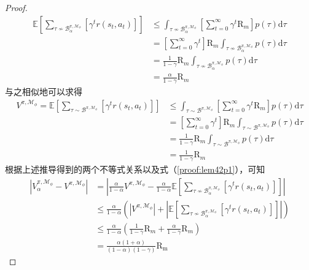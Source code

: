 \begin{proof}
\begin{align}
\mathbb{E}\left[{\sum}_{\tau \not\sim\mathcal{B}_\alpha^{\pi,\mathcal{M}_\phi}}\left[\gamma^t r(s_t,a_t)\right]\right] &\leq\int_{\tau\not\sim{\mathcal{B}_\alpha^{\pi,\mathcal{M}_\phi}}}\left[\sum_{t=0}^\infty\gamma^t \mathrm{R}_m\right]p(\tau)\mathrm{d}\tau\\
&=\left[\sum_{t=0}^\infty\gamma^t\right]\mathrm{R}_m\int_{\tau\not\sim{\mathcal{B}_\alpha^{\pi,\mathcal{M}_\phi}}}p(\tau)\mathrm{d}\tau\\
&= \frac{1}{1-\gamma}\mathrm{R}_m \int_{\tau\not\sim{\mathcal{B}_\alpha^{\pi,\mathcal{M}_\phi}}}p(\tau)\mathrm{d}\tau\\
&=\frac{\alpha}{1-\gamma}\mathrm{R}_m
\end{align}
与之相似地可以求得
\begin{align}
V^{\pi,\mathcal{M}_\phi} = \mathbb{E}\left[{\sum}_{\tau \sim\mathcal{B}^{\pi,\mathcal{M}_\phi}}\left[\gamma^t r(s_t,a_t)\right]\right] &\leq\int_{\tau \sim\mathcal{B}^{\pi,\mathcal{M}_\phi}}\left[\sum_{t=0}^\infty\gamma^t \mathrm{R}_m\right]p(\tau)\mathrm{d}\tau\\
&=\left[\sum_{t=0}^\infty\gamma^t\right]\mathrm{R}_m\int_{\tau \sim\mathcal{B}^{\pi,\mathcal{M}_\phi}}p(\tau)\mathrm{d}\tau\\
&= \frac{1}{1-\gamma}\mathrm{R}_m \int_{\tau \sim\mathcal{B}^{\pi,\mathcal{M}_\phi}}p(\tau)\mathrm{d}\tau\\
&=\frac{1}{1-\gamma}\mathrm{R}_m
\end{align}
根据上述推导得到的两个不等式关系以及式（\ref{proof:lem42p1}），可知
\begin{align}
|{V}_\alpha^{\pi, \mathcal{M}_{\phi}} - {V}^{\pi,\mathcal{M}_{\phi}}| &=  \left|\frac{\alpha}{1-\alpha}V^{\pi,\mathcal{M}_\phi}-\frac{\alpha}{1-\alpha}\mathbb{E}\left[{\sum}_{\tau \not\sim\mathcal{B}_\alpha^{\pi,\mathcal{M}_\phi}}\left[\gamma^t r(s_t,a_t)\right]\right]\right| \\
&\leq\frac{\alpha}{1-\alpha}\left(\left|V^{\pi,\mathcal{M}_\phi}\right|+\left|\mathbb{E}\left[{\sum}_{\tau \not\sim\mathcal{B}_\alpha^{\pi,\mathcal{M}_\phi}}\left[\gamma^t r(s_t,a_t)\right]\right]\right|\right)\\
&\leq \frac{\alpha}{1-\alpha}\left(\frac{1}{1-\gamma}\mathrm{R}_m+\frac{\alpha}{1-\gamma}\mathrm{R}_m\right) \\
&=\frac{\alpha(1+\alpha)}{(1-\alpha)(1-\gamma)}\mathrm{R_{m}} \label{eq:lem42}
\end{align}

\end{proof}

